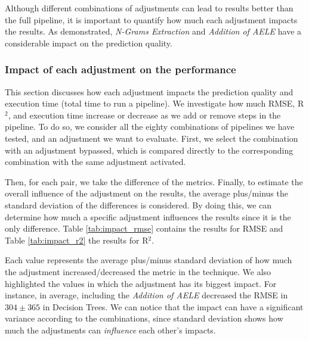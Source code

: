 Although different combinations of adjustments can lead to results better than the full pipeline, 
it is important to quantify how much each adjustment impacts the results. As demonstrated, \textit{N-Grams Extraction} and \textit{Addition of \gls{AELE}} have a considerable impact on the prediction quality.


\subsubsection{Impact of each adjustment on the performance}

This section discusses how each adjustment impacts the prediction quality and execution time (total time to run a pipeline). We investigate how much \gls{RMSE}, R$^2$, and execution time increase or decrease as we add or remove steps in the pipeline. To do so, we consider all the eighty combinations of pipelines we have tested, and an adjustment we want to evaluate. First, we select the combination with an adjustment bypassed, which is compared directly to the corresponding combination with the same adjustment activated.

Then, for each pair, we take the difference of the metrics. Finally, to estimate the overall influence of the adjustment on the results, the average plus/minus the standard deviation of the differences is considered. By doing this, we can determine how much a specific adjustment influences the results since it is the only difference.
Table \ref{tab:impact_rmse} contains the results for \gls{RMSE} and Table \ref{tab:impact_r2} the results for R$^2$. 

Each value represents the average plus/minus standard deviation of how much the adjustment increased/decreased the metric in the technique. We also highlighted the values in which the adjustment has its biggest impact. For instance, in average, including the \textit{Addition of \gls{AELE}} decreased the \gls{RMSE} in $304 \pm 365$ in Decision Trees. We can notice that the impact can have a significant variance according to the combinations, since standard deviation shows how much the adjustments can \textit{influence} each other's impacts.

